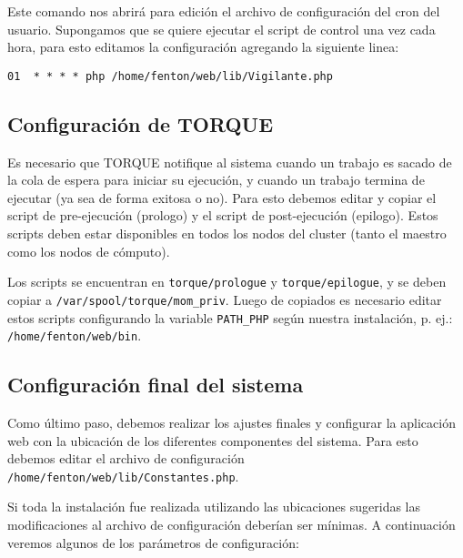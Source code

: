 \documentclass[a4paper,10pt,spanish]{article}
\begin{document}
Este comando nos abrir\'{a} para edici\'{o}n el archivo de configuraci\'{o}n del cron del usuario. Supongamos que se quiere ejecutar el script de control una vez cada hora, para esto editamos la configuraci\'{o}n agregando la siguiente linea:

\begin{verbatim}
01  * * * * php /home/fenton/web/lib/Vigilante.php
\end{verbatim}

\subsection{Configuraci\'{o}n de TORQUE}

Es necesario que TORQUE notifique al sistema cuando un trabajo es sacado de la cola de espera para iniciar su ejecuci\'{o}n, y cuando un trabajo termina de ejecutar (ya sea de forma exitosa o no). Para esto debemos editar y copiar el script de pre-ejecuci\'{o}n (prologo) y el script de post-ejecuci\'{o}n (epilogo). Estos scripts deben estar disponibles en todos los nodos del cluster (tanto el maestro como los nodos de c\'{o}mputo). 

Los scripts se encuentran en \mbox{\texttt{torque/prologue}} y \mbox{\texttt{torque/epilogue}}, y se deben copiar a \mbox{\texttt{/var/spool/torque/mom\_priv}}. Luego de copiados es necesario editar estos scripts configurando la variable \mbox{\texttt{PATH\_PHP}} seg\'{u}n nuestra instalaci\'{o}n, p. ej.: \mbox{\texttt{/home/fenton/web/bin}}.

\subsection{Configuraci\'{o}n final del sistema}

Como \'{u}ltimo paso, debemos realizar los ajustes finales y configurar la aplicaci\'{o}n web con la ubicaci\'{o}n de los diferentes componentes del sistema. Para esto debemos editar el archivo de configuraci\'{o}n \mbox{\texttt{/home/fenton/web/lib/Constantes.php}}.

Si toda la instalaci\'{o}n fue realizada utilizando las ubicaciones sugeridas las modificaciones al archivo de configuraci\'{o}n deber\'{i}an ser m\'{i}nimas. A continuaci\'{o}n veremos algunos de los par\'{a}metros de configuraci\'{o}n:
\end{document}
